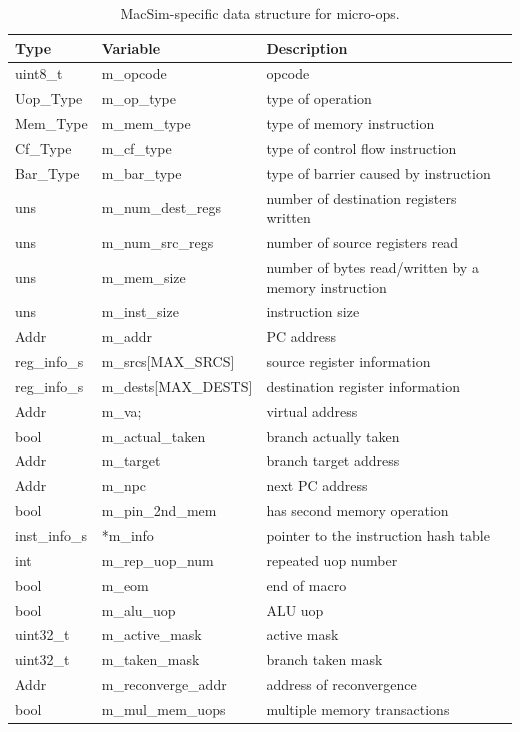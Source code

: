 \begin{table}[htb]
\begin{footnotesize}
\begin{center}
\caption{MacSim-specific data structure for micro-ops.}
\label{table:trace_uops}
\begin{tabular}{|l|l|l|} 
\hline
Type      & Variable                 & Description \\ \hline \hline
uint8\_t  & m\_opcode                & opcode \\ \hline
Uop\_Type & m\_op\_type              & type of operation \\ \hline
Mem\_Type & m\_mem\_type             & type of memory instruction \\ \hline
Cf\_Type  & m\_cf\_type              & type of control flow instruction \\ \hline
Bar\_Type & m\_bar\_type             & type of barrier caused by instruction \\ \hline
uns       &   m\_num\_dest\_regs     & number of destination registers written \\ \hline
uns       &   m\_num\_src\_regs      & number of source registers read \\ \hline
uns       &   m\_mem\_size           & number of bytes read/written by a memory instruction \\ \hline
uns       &   m\_inst\_size          & instruction size \\ \hline
Addr      &   m\_addr                & PC address  \\ \hline
reg\_info\_s&   m\_srcs[MAX\_SRCS]   & source register information \\ \hline
reg\_info\_s&   m\_dests[MAX\_DESTS] & destination register information \\ \hline
Addr      &   m\_va;                 & virtual address \\ \hline
bool      &   m\_actual\_taken       & branch actually taken \\ \hline
Addr      &   m\_target              & branch target address \\ \hline
Addr      &   m\_npc                 & next PC address  \\ \hline
bool      &   m\_pin\_2nd\_mem       & has second memory operation \\ \hline
inst\_info\_s& *m\_info              & pointer to the instruction hash table  \\ \hline
int       &   m\_rep\_uop\_num       & repeated uop number \\ \hline
bool      &   m\_eom                 & end of macro \\ \hline
bool      &   m\_alu\_uop            & ALU uop  \\ \hline
uint32\_t  &   m\_active\_mask       & active mask \\ \hline
uint32\_t  &   m\_taken\_mask        & branch taken mask \\ \hline
Addr      &   m\_reconverge\_addr    & address of reconvergence \\ \hline
bool      &   m\_mul\_mem\_uops      & multiple memory transactions \\ \hline


\end{tabular}
\end{center}
\end{footnotesize}
\end{table}
